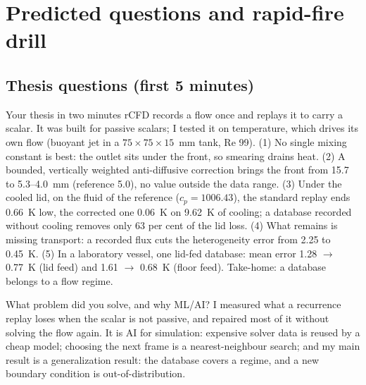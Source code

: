 \section{Predicted questions and rapid-fire drill}

\subsection{Thesis questions (first 5 minutes)}

\begin{summary}{Your thesis in two minutes}
rCFD records a flow once and replays it to carry a scalar. It was built for passive scalars; I
tested it on temperature, which drives its own flow (buoyant jet in a $75\times75\times15$~mm tank,
Re 99). (1) No single mixing constant is best: the outlet sits under the front, so smearing
drains heat. (2) A bounded, vertically weighted anti-diffusive correction brings the front from
15.7 to 5.3--4.0~mm (reference 5.0), no value outside the data range. (3) Under the cooled lid,
on the fluid of the reference ($c_p=1006.43$), the standard replay ends 0.66~K low, the corrected
one 0.06~K on 9.62~K of cooling; a database recorded without cooling removes only 63 per cent of
the lid loss. (4) What remains is missing transport: a recorded flux cuts the heterogeneity error
from 2.25 to 0.45~K. (5) In a laboratory vessel, one lid-fed database: mean error 1.28 $\to$ 0.77~K
(lid feed) and 1.61 $\to$ 0.68~K (floor feed). Take-home: a database belongs to a flow regime.
\end{summary}


\begin{qabox}[chair]{\asked What problem did you solve, and why ML/AI?}
\ans I measured what a recurrence replay loses when the scalar is not passive, and repaired most of
it without solving the flow again. It is AI for simulation: expensive solver data is reused by a
cheap model; choosing the next frame is a nearest-neighbour search; and my main result is a
generalization result: the database covers a regime, and a new boundary condition is
out-of-distribution.
\end{qabox}

